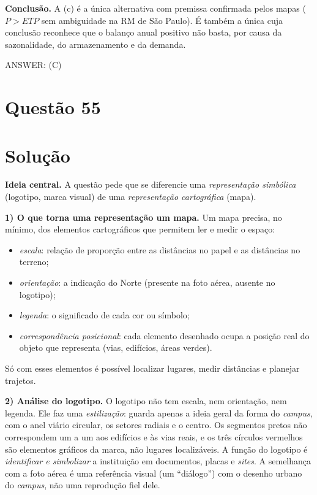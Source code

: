 \documentclass{article}%
\begin{document}
\textbf{Conclusão.} A (c) é a única alternativa com premissa confirmada pelos mapas ($P > ETP$ sem ambiguidade na RM de São Paulo). É também a única cuja conclusão reconhece que o balanço anual positivo não basta, por causa da sazonalidade, do armazenamento e da demanda.

ANSWER: (C)%
\newpage%
\section*{Questão 55}

\section*{Solução}

\textbf{Ideia central.} A questão pede que se diferencie uma \emph{representação simbólica} (logotipo, marca visual) de uma \emph{representação cartográfica} (mapa).

\textbf{1) O que torna uma representação um mapa.} Um mapa precisa, no mínimo, dos elementos cartográficos que permitem ler e medir o espaço:
\begin{itemize}
  \item \emph{escala}: relação de proporção entre as distâncias no papel e as distâncias no terreno;
  \item \emph{orientação}: a indicação do Norte (presente na foto aérea, ausente no logotipo);
  \item \emph{legenda}: o significado de cada cor ou símbolo;
  \item \emph{correspondência posicional}: cada elemento desenhado ocupa a posição real do objeto que representa (vias, edifícios, áreas verdes).
\end{itemize}
Só com esses elementos é possível localizar lugares, medir distâncias e planejar trajetos.

\textbf{2) Análise do logotipo.} O logotipo não tem escala, nem orientação, nem legenda. Ele faz uma \emph{estilização}: guarda apenas a ideia geral da forma do \emph{campus}, com o anel viário circular, os setores radiais e o centro. Os segmentos pretos não correspondem um a um aos edifícios e às vias reais, e os três círculos vermelhos são elementos gráficos da marca, não lugares localizáveis. A função do logotipo é \emph{identificar e simbolizar} a instituição em documentos, placas e \emph{sites}. A semelhança com a foto aérea é uma referência visual (um ``diálogo'') com o desenho urbano do \emph{campus}, não uma reprodução fiel dele.
\end{document}
